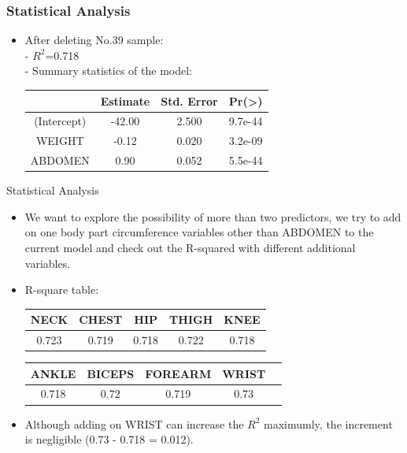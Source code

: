 \documentclass{beamer}
\begin{document}
\begin{frame}
\frametitle{Statistical Analysis} 
\begin{itemize}
    \item After deleting No.39 sample:\\
    - $R^2$=0.718\\
    - Summary statistics of the model:
            \begin{table}
	        \centering
        	\begin{tabular}{cccc}  
	        	\toprule
	        	& Estimate &	Std. Error & Pr(\textgreater\abs{t})\\  
	        	\midrule        %
	        	 (Intercept) &	-42.00 &	2.500 &	9.7e-44 \\
	           	WEIGHT &	-0.12 &	0.020 &	3.2e-09 \\
		         ABDOMEN &	0.90 &	0.052 &	5.5e-44 \\
	        	\bottomrule
        	\end{tabular}
        \end{table}
\end{itemize}


\end{frame}



\begin{frame}{Statistical Analysis}
\begin{itemize}
    \item We want to explore the possibility of more than two predictors, we try to add on one body part circumference variables other than ABDOMEN to the current model and check out the R-squared with different additional variables.
    \item  R-square table:
        \begin{table}[!htbp]
        \centering
        \begin{tabular}{ccccc}
        \hline
        NECK &	CHEST &	HIP &	THIGH &	KNEE \\
        \hline
        0.723 &	0.719 &	0.718 &	0.722 &	0.718 \\
        \end{tabular}
        \end{table}
        
        \begin{table}[!htbp]
        \centering
        \begin{tabular}{ccccc}
        \hline
         ANKLE &	BICEPS & FOREARM &	WRIST\\
        \hline
        0.718 &	0.72 &	0.719 &	0.73\\
        \end{tabular}
        \end{table}
        

    \item Although adding on WRIST can increase the $R^2$ maximumly, the increment is negligible (0.73 - 0.718 = 0.012).
\end{itemize}

\end{frame}
\end{document}
